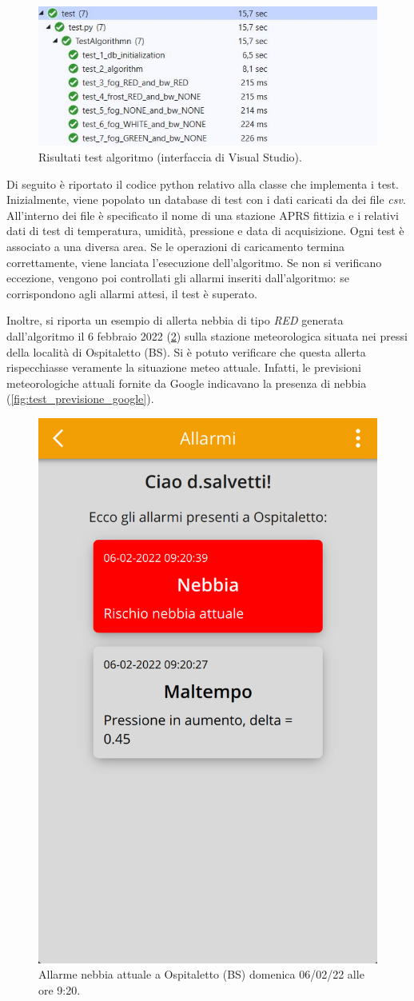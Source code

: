 \begin{figure}[h!]
	\centering
	\includegraphics[width=1\linewidth]{./Iterazione 3/ImageFiles/TestResultAlgorithm}
	\caption{Risultati test algoritmo (interfaccia di Visual Studio).}
	\label{fig:test_result_alg}
\end{figure}

Di seguito è riportato il codice python relativo alla classe che implementa i test. Inizialmente, viene popolato un database di test con i dati caricati da dei file \textit{csv}. All'interno dei file è specificato il nome di una stazione APRS fittizia e i relativi dati di test di temperatura, umidità, pressione e data di acquisizione. Ogni test è associato a una diversa area.  Se le operazioni di caricamento termina correttamente, viene lanciata l'esecuzione dell'algoritmo. Se non si verificano eccezione, vengono poi controllati gli allarmi inseriti dall'algoritmo: se corrispondono agli allarmi attesi, il test è superato.

\UseRawInputEncoding


Inoltre, si riporta un esempio di allerta nebbia di tipo \textit{RED} generata dall'algoritmo il 6 febbraio 2022 (\Fig\ref{fig:test_previsione_alg}) sulla stazione meteorologica situata nei pressi della località di Ospitaletto (BS). Si è potuto verificare che questa allerta rispecchiasse veramente la situazione meteo attuale. Infatti, le previsioni meteorologiche attuali fornite da Google indicavano la presenza di nebbia (\Fig\ref{fig:test_previsione_google}).

\begin{figure}[h!]
	\centering
	\includegraphics[width=0.3\linewidth]{./Iterazione 3/ImageFiles/testAppRedFog}
	\caption{Allarme nebbia attuale a Ospitaletto (BS) domenica 06/02/22 alle ore 9:20.}
	\label{fig:test_previsione_alg}
\end{figure}

